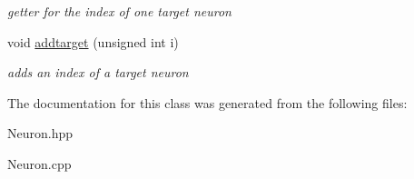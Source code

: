 \begin{DoxyCompactItemize}
\begin{DoxyCompactList}\small\item\em getter for the index of one target neuron \end{DoxyCompactList}\item 
\hypertarget{classNeuron_aa1f8780a2fa8f5c64a8be9929d54a3fa}{void \hyperlink{classNeuron_aa1f8780a2fa8f5c64a8be9929d54a3fa}{addtarget} (unsigned int i)}\label{classNeuron_aa1f8780a2fa8f5c64a8be9929d54a3fa}

\begin{DoxyCompactList}\small\item\em adds an index of a target neuron \end{DoxyCompactList}\end{DoxyCompactItemize}


The documentation for this class was generated from the following files\-:\begin{DoxyCompactItemize}
\item 
Neuron.\-hpp\item 
Neuron.\-cpp\end{DoxyCompactItemize}
